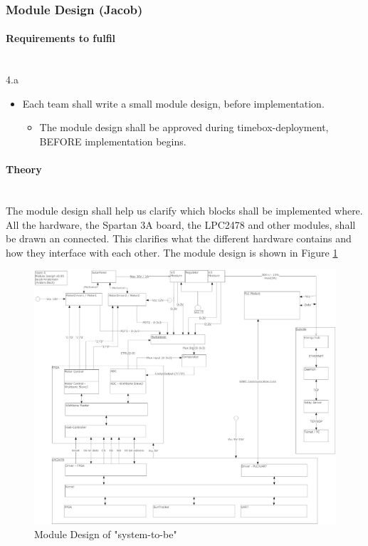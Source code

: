 \subsubsection{Module Design (Jacob)} 
\paragraph{Requirements to fulfil}\mbox{}\\
4.a\\

\begin{itemize}
	\item Each team shall write a small module design, before implementation.
	\begin{itemize}
		\item The module design shall be approved during timebox-deployment, BEFORE implementation begins.
	\end{itemize}
\end{itemize}


\paragraph{Theory}\mbox{}\\
The module design shall help us clarify which blocks shall be implemented where. All the hardware, the Spartan 3A board, the LPC2478 and other modules, shall be drawn an connected. This clarifies what the different hardware contains and how they interface with each other. The module design is shown in Figure \ref{fig:module_design_v0_9}

\begin{landscape}
\begin{figure}[h!]
\includegraphics[width=20CM]{./img/module_design_v0_9_5}
\caption{Module Design of "system-to-be"}
\label{fig:module_design_v0_9}
\end{figure}
\end{landscape}

